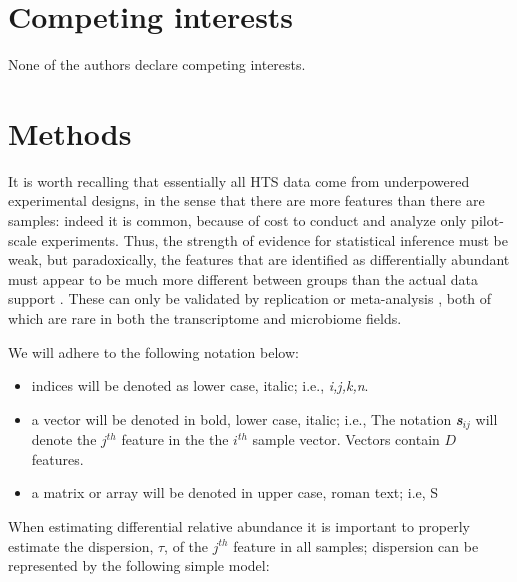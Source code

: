 \documentclass{bmcart}
\begin{document}
\section{Competing interests}

None of the authors declare competing interests.

\section*{Methods}


It is worth recalling that essentially all HTS data come from underpowered experimental designs, in the sense that there are more features than there are samples: indeed it is common, because of cost to conduct and analyze only pilot-scale experiments. Thus, the strength of evidence for statistical inference must be weak, but paradoxically, the features that are identified as differentially abundant must appear to be much more different between groups than the actual data support  \cite{Halsey:2015aa}. These can only be validated by replication or meta-analysis \cite{Cumming:2008aa}, both of which are rare in both the transcriptome and microbiome fields. 

We will adhere to the following notation below:
\begin{itemize}
\item{indices} will be denoted as lower case, italic; i.e., \textit{i,j,k,n}. 
\item{a vector} will be denoted in bold, lower case, italic; i.e., The notation \textit{\textbf{s$_{ij}$}} will denote the $j^{th}$ feature in the the $i^{th}$ sample vector. Vectors contain $D$ features. 
\item{a matrix or array} will be denoted in upper case, roman text; i.e, S
\end{itemize}


When estimating differential relative abundance it is important to properly estimate the dispersion, $\tau$, of the $j^{th}$ feature in all samples; dispersion can be represented by the following simple model:
\end{document}
